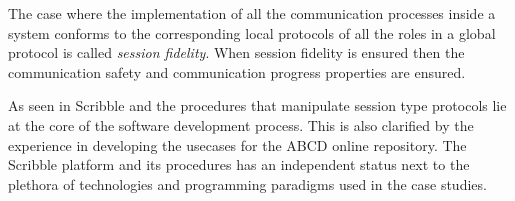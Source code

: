 The case where the implementation of all the communication
processes inside a system conforms to the corresponding
local protocols of all the roles in a global protocol 
is called {\em session fidelity}.
When session fidelity is ensured then the communication safety
and communication progress properties are ensured.
%	

As seen in  Scribble and the procedures
that manipulate session type protocols lie at the core
of the software development process. This is also clarified
by the experience in developing the usecases for the ABCD
online repository. The Scribble platform and its procedures
has an independent status next to the plethora of technologies and
programming paradigms used in the case studies.

%


